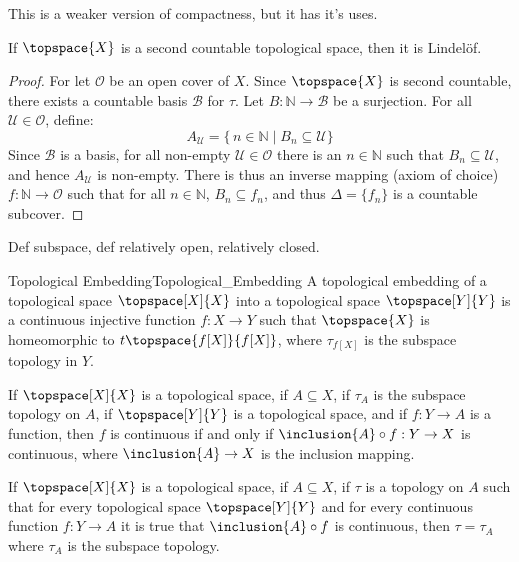 \documentclass{article}                                                        %
\begin{document}
        This is a weaker version of compactness, but it has it's uses.
        \begin{theorem}
            If $\topspace{X}$ is a second countable topological space, then it
            is Lindel\"{o}f.
        \end{theorem}
        \begin{proof}
            For let $\mathcal{O}$ be an open cover of $X$. Since $\topspace{X}$
            is second countable, there exists a countable basis $\mathcal{B}$
            for $\tau$. Let $B:\mathbb{N}\rightarrow\mathcal{B}$ be a
            surjection. For all $\mathcal{U}\in\mathcal{O}$, define:
            \begin{equation}
                A_{\mathcal{U}}=
                    \{\,n\in\mathbb{N}\;|\;B_{n}\subseteq\mathcal{U}\}
            \end{equation}
            Since $\mathcal{B}$ is a basis, for all non-empty
            $\mathcal{U}\in\mathcal{O}$ there is an $n\in\mathbb{N}$ such that
            $B_{n}\subseteq\mathcal{U}$, and hence $A_{\mathcal{U}}$ is
            non-empty. There is thus an inverse mapping (axiom of choice)
            $f:\mathbb{N}\rightarrow\mathcal{O}$ such that for all
            $n\in\mathbb{N}$, $B_{n}\subseteq{f}_{n}$, and thus
            $\Delta=\{f_{n}\}$ is a countable subcover.
        \end{proof}
        Def subspace, def relatively open, relatively closed.
        \begin{fdefinition}{Topological Embedding}{Topological_Embedding}
            A topological embedding of a topological space $\topspace[X]{X}$
            into a topological space $\topspace[Y]{Y}$ is a continuous injective
            function $f:X\rightarrow{Y}$ such that $\topspace{X}$ is
            homeomorphic to $t\topspace{f[X]}{f[X]}$, where
            $\tau_{f[X]}$ is the subspace topology in $Y$.
        \end{fdefinition}
        \begin{theorem}
            If $\topspace[X]{X}$ is a topological space, if $A\subseteq{X}$,
            if $\tau_{A}$ is the subspace topology on $A$, if $\topspace[Y]{Y}$
            is a topological space, and if $f:Y\rightarrow{A}$ is a function,
            then $f$ is continuous if and only if
            $\inclusion{A}\circ{f}:Y\rightarrow{X}$ is continuous, where
            $\inclusion{A}\rightarrow{X}$ is the inclusion mapping.
        \end{theorem}
        \begin{theorem}
            If $\topspace[X]{X}$ is a topological space, if $A\subseteq{X}$,
            if $\tau$ is a topology on $A$ such that for every topological space
            $\topspace[Y]{Y}$ and for every continuous function
            $f:Y\rightarrow{A}$ it is true that $\inclusion{A}\circ{f}$ is
            continuous, then $\tau=\tau_{A}$ where $\tau_{A}$ is the subspace
            topology.
        \end{theorem}
\end{document}
